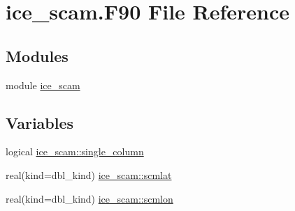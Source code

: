 \hypertarget{ice__scam_8F90}{
\section{ice\_\-scam.F90 File Reference}
\label{ice__scam_8F90}
}
\subsection*{Modules}
\begin{DoxyCompactItemize}
\item 
module \hyperlink{namespaceice__scam}{ice\_\-scam}
\end{DoxyCompactItemize}
\subsection*{Variables}
\begin{DoxyCompactItemize}
\item 
logical \hyperlink{namespaceice__scam_a34d0d2e7da10c0e3b977aa989b318dac}{ice\_\-scam::single\_\-column}
\item 
real(kind=dbl\_\-kind) \hyperlink{namespaceice__scam_a72933cc98dddc52d1f629eb311a715af}{ice\_\-scam::scmlat}
\item 
real(kind=dbl\_\-kind) \hyperlink{namespaceice__scam_a3064f1ae884e72d621f753a3a3363b17}{ice\_\-scam::scmlon}
\end{DoxyCompactItemize}
